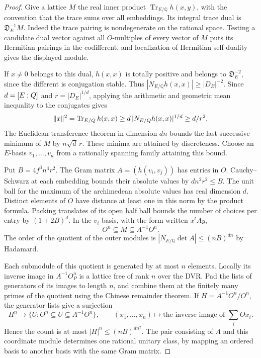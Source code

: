 \begin{proof}
Give a lattice \(M\) the real inner product
\(\operatorname{Tr}_{E/\mathbb Q}h(x,y)\), with the convention that
the trace sums over all embeddings. Its integral trace dual is
\(\mathfrak D_E^{-1}M\). Indeed the trace pairing is nondegenerate
on the rational space. Testing a candidate dual vector against all
\(O\)-multiples of every vector of \(M\) puts its Hermitian
pairings in the codifferent, and localization of Hermitian
self-duality gives the displayed module.

If \(x\ne0\) belongs to
this dual, \(h(x,x)\) is totally positive and belongs to
\(\mathfrak D_E^{-2}\), since the different is conjugation stable.
Thus \(|N_{E/\mathbb Q}h(x,x)|\ge |D_E|^{-2}\). Since \(d=[E:Q]\) and \(r=|D_E|^{1/d}\), applying the arithmetic
and geometric mean inequality to the conjugates gives
\[
 \|x\|^2=\operatorname{Tr}_{E/Q}h(x,x)
     \ge d\,|N_{E/Q}h(x,x)|^{1/d}\ge d/r^2.
\]
The Euclidean transference theorem in dimension \(dn\) bounds the
last successive minimum of \(M\) by \(n\sqrt d\,r\). These minima
are attained by discreteness. Choose an \(E\)-basis \(v_1,\ldots,v_n\)
from a rationally spanning family attaining this bound.
\cite{banaszczyk}

Put \(B=4f^3 n^4 r^2\). The Gram matrix \(A=(h(v_i,v_j))\) has
entries in \(O\). Cauchy--Schwarz at each embedding bounds their
absolute values by \(dn^2r^2\le B\). The unit ball for the maximum
of the archimedean absolute values has real dimension \(d\).
Distinct elements of \(O\) have distance at least one in this norm
by the product formula. Packing translates of its open half ball
bounds the number of choices per entry by \((1+2B)^d\).
In the \(v_i\) basis, with the form written \(\bar x^t A y\),
\[
           O^n\subseteq M\subseteq A^{-1}O^n .
\]
The order of the quotient of the outer modules is
\(|N_{E/\mathbb Q}\det A|\le(nB)^{dn}\) by Hadamard.

Each submodule of this quotient is generated by at most \(n\)
elements. Locally its inverse image in \(A^{-1}O_P^n\) is a
lattice free of rank \(n\) over the DVR. Pad the lists of
generators of its images to length \(n\), and combine them at the
finitely many primes of the quotient using the Chinese remainder
theorem. If \(H=A^{-1}O^n/O^n\), the generator lists give a surjection
\[
 H^n\longrightarrow\{U:O^n\subseteq U\subseteq A^{-1}O^n\},
 \qquad (x_1,\ldots,x_n)\longmapsto
  \text{the inverse image of }\sum_i O x_i .
\]
Hence the count is at most \(|H|^n\le(nB)^{dn^2}\).
The pair consisting of \(A\) and this coordinate module determines
one rational unitary class, by mapping an ordered basis to another
basis with the same Gram matrix.


\end{proof}
